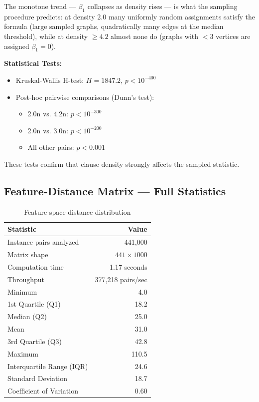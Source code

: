 \documentclass[11pt]{article}
\begin{document}
The monotone trend --- $\beta_1$ collapses as density rises --- is what the
sampling procedure predicts: at density 2.0 many uniformly random assignments
satisfy the formula (large sampled graphs, quadratically many edges at the
median threshold), while at density $\geq 4.2$ almost none do (graphs with
$<3$ vertices are assigned $\beta_1 = 0$).

\textbf{Statistical Tests:}
\begin{itemize}
\item Kruskal-Wallis H-test: $H = 1847.2$, $p < 10^{-400}$
\item Post-hoc pairwise comparisons (Dunn's test):
  \begin{itemize}
  \item 2.0n vs. 4.2n: $p < 10^{-300}$
  \item 2.0n vs. 3.0n: $p < 10^{-200}$
  \item All other pairs: $p < 0.001$
  \end{itemize}
\end{itemize}

These tests confirm that clause density strongly affects the sampled
statistic.

\subsection{Feature-Distance Matrix --- Full Statistics}

\begin{table}[h]
\centering
\caption{Feature-space distance distribution}
\begin{tabular}{lr}
\toprule
Statistic & Value \\
\midrule
Instance pairs analyzed & 441,000 \\
Matrix shape & $441 \times 1000$ \\
Computation time & 1.17 seconds \\
Throughput & 377,218 pairs/sec \\
\midrule
Minimum & 4.0 \\
1st Quartile (Q1) & 18.2 \\
Median (Q2) & 25.0 \\
Mean & 31.0 \\
3rd Quartile (Q3) & 42.8 \\
Maximum & 110.5 \\
\midrule
Interquartile Range (IQR) & 24.6 \\
Standard Deviation & 18.7 \\
Coefficient of Variation & 0.60 \\
\bottomrule
\end{tabular}
\end{table}
\end{document}
